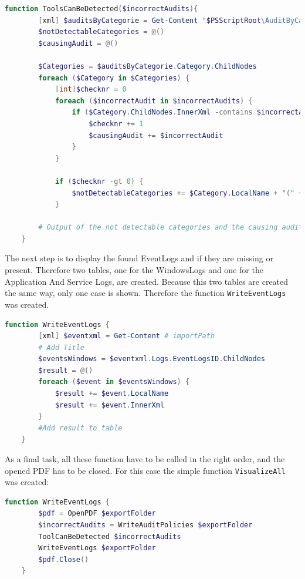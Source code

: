 \begin{lstlisting}[caption=Function ToolsCanBeDetected, language=PowerShell]
    function ToolsCanBeDetected($incorrectAudits){
        [xml] $auditsByCategorie = Get-Content "$PSScriptRoot\AuditByCategorie.xml"
        $notDetectableCategories = @()
        $causingAudit = @()

        $Categories = $auditsByCategorie.Category.ChildNodes
        foreach ($Category in $Categories) {
            [int]$checknr = 0
            foreach ($incorrectAudit in $incorrectAudits) {
                if ($Category.ChildNodes.InnerXml -contains $incorrectAudit) {
                    $checknr += 1
                    $causingAudit += $incorrectAudit
                }
            }
        
            if ($checknr -gt 0) {
                $notDetectableCategories += $Category.LocalName + "(" + $causingAudit + ")"
            }

        # Output of the not detectable categories and the causing audits    
    }
\end{lstlisting}
The next step is to display the found EventLogs and if they are missing or present. Therefore two tables, one for the WindowsLogs and one for the Application And Service Logs, are created. Because this two tables are created the same way, only one case is shown. Therefore the function \lstinline|WriteEventLogs| was created.
\begin{lstlisting}[caption=Function ToolsCanBeDetected, language=PowerShell]
    function WriteEventLogs { 
        [xml] $eventxml = Get-Content # importPath
        # Add Title
        $eventsWindows = $eventxml.Logs.EventLogsID.ChildNodes
        $result = @()
        foreach ($event in $eventsWindows) {
            $result += $event.LocalName
            $result += $event.InnerXml
        }
        #Add result to table
    }
\end{lstlisting}
As a final task, all these function have to be called in the right order, and the opened PDF has to be closed. For this case the simple function \lstinline|VisualizeAll| was created:
\begin{lstlisting}[caption=Function VisualizeAll, language=PowerShell]
    function WriteEventLogs { 
        $pdf = OpenPDF $exportFolder
        $incorrectAudits = WriteAuditPolicies $exportFolder
        ToolCanBeDetected $incorrectAudits
        WriteEventLogs $exportFolder
        $pdf.Close()
    }
\end{lstlisting}